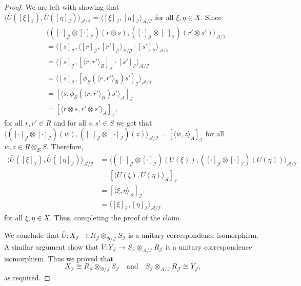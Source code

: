 \documentclass[11pt, letterpaper,final]{amsart}
\newcommand{\A}{{\mathcal{A}}}
\newcommand{\B}{{\mathcal{B}}}
\newcommand{\I}{{\mathcal{I}}}
\newcommand{\J}{{\mathcal{J}}}
\theoremstyle{definition}
\begin{document}
\begin{proof}
We are left with showing that $\langle \overline{U} ([\xi]_{\I}), \overline{U}( [\eta]_{\I}) \rangle_{ \A/ \I } = \langle [\xi]_{\I}, [\eta]_{\I} \rangle_{\A/\I}$ for all $\xi,\eta \in X$.  Since 
\begin{align*}
&\langle ([\cdot]_{\J} \otimes [\cdot]_{\I}) ( r \otimes s ) , ([\cdot]_{\J} \otimes [\cdot]_{\I}) (r' \otimes s') \rangle_{\A/\I}\\
&= \langle [s]_{\I}, \langle [r]_{\J}, [r']_{\J} \rangle_{\B/\J} \cdot [s']_{\I} \rangle_{\A/\I} \\
            &= \langle [s]_{\I}, [\langle r, r'\rangle_B]_{\J} \cdot [s']_{\I} \rangle_{\A/\I} \\
            &= \langle [s]_{\I}, [ \phi_S ( \langle r, r' \rangle_{\B} )s' ]_{\I} \rangle_{\A/\I} \\
            &=[ \langle s , \phi_S ( \langle r, r' \rangle_B )s' \rangle_{\A} ]_{\I} \\
            &= [ \langle r \otimes s , r' \otimes s' \rangle_A ]_{\I},
\end{align*}
for all $r,r' \in R$ and for all $s, s' \in S$ we get that $\langle ([\cdot]_{\J} \otimes [\cdot]_{\I}) (w ) , ([\cdot]_{\J} \otimes [\cdot]_{\I}) (z) \rangle_{\A/\I} = [ \langle w, z \rangle_A ]_{\I}$ for all $w, z \in R \otimes_{\B} S$.  Therefore,
\begin{align*}
  \langle \overline{U} ([\xi]_{\I}), \overline{U}( [\eta]_{\I}) \rangle_{ \A/ \I } &= \langle ([\cdot]_{\J} \otimes [\cdot]_{\I}) (U(\xi)) , ([\cdot]_{\J} \otimes [\cdot]_{\I}) (U(\eta)) \rangle_{\A/\I}  \\
    &= [ \langle U(\xi), U(\eta) \rangle_{\A} ]_{\I} \\
    &= [ \langle \xi, \eta \rangle_{\A} ]_{\I} \\
    &= \langle [\xi]_{\I}, [\eta]_{\I} \rangle_{\A/\I}
\end{align*}
for all $\xi,\eta \in X$.  Thus, completing the proof of the claim.

We conclude that $\overline{U} \colon X_{\I} \to R_{\J} \otimes_{\B/\J} S_{\I}$ is a unitary correspondence isomorphism.  A similar argument show that $\overline{V} \colon Y_{\J} \to S_{\I} \otimes_{\A/\I} R_{\J}$ is a unitary correspondence isomorphism.  Thus we proved that
$$X_{\I} \cong R_{\J} \otimes_{\B/\J} S_{\I} \quad \text{and} \quad S_{\I} \otimes_{\A/\I} R_{\J} \cong Y_{\J},$$
as required.
\end{proof}
\end{document}
